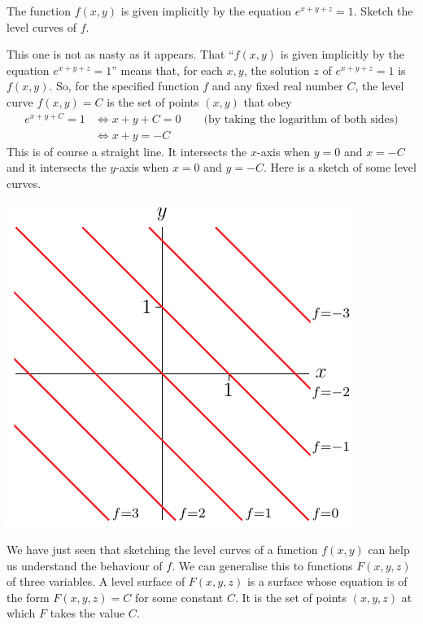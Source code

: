 \bigskip\goodbreak
\begin{eg}[$e^{x+y+z}=1$]
\medskip
The function $f(x,y)$ is given implicitly by the equation $e^{x+y+z}=1$.
Sketch the level curves of $f$. 

\soln 
This one is not as nasty as it appears.  
That ``$f(x,y)$ is given implicitly by the equation $e^{x+y+z}=1$''
means that, for each $x,y$,  the solution $z$ of $e^{x+y+z}=1$ is
$f(x,y)$. So, for the specified function $f$ and any fixed real number $C$,
the level curve $f(x,y)=C$ is the set of points $(x,y)$ that obey
\begin{align*}
e^{x+y+C}=1
&\iff x+y+C = 0\qquad\text{(by taking the logarithm of both sides)} \\
&\iff x+y = -C
\end{align*}
This is of course a straight line. It intersects the $x$-axis when $y=0$ 
and $x=-C$ and it intersects the $y$-axis when $x=0$ and $y=-C$.
Here is a sketch of some level curves.
\begin{efig}
\begin{center}
   \includegraphics{planeLevel.pdf}
\end{center}
\end{efig}
\end{eg}

We have just seen that sketching the level curves of a function $f(x,y)$
can help us understand the behaviour of $f$. We can generalise this
to functions $F(x,y,z)$ of three variables. A level surface of $F(x,y,z)$
is a surface whose equation is of the form $F(x,y,z)=C$ for some 
constant $C$. It is the set of points $(x,y,z)$ at which $F$ takes 
the value $C$. 

